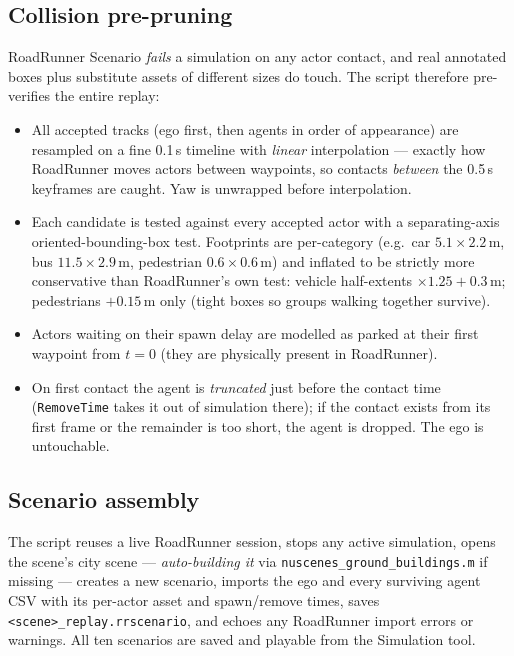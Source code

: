 \documentclass[11pt]{article}
\newcommand{\code}[1]{{\setlength{\fboxsep}{1.5pt}\colorbox{codegray}{\small\texttt{#1}}}}
\newcommand{\file}[1]{\texttt{#1}}
\begin{document}
\subsection{Collision pre-pruning}
RoadRunner Scenario \emph{fails} a simulation on any actor contact, and real annotated
boxes plus substitute assets of different sizes do touch. The script therefore
pre-verifies the entire replay:
\begin{itemize}
\item All accepted tracks (ego first, then agents in order of appearance) are resampled
      on a fine 0.1\,s timeline with \emph{linear} interpolation --- exactly how
      RoadRunner moves actors between waypoints, so contacts \emph{between} the 0.5\,s
      keyframes are caught. Yaw is unwrapped before interpolation.
\item Each candidate is tested against every accepted actor with a separating-axis
      oriented-bounding-box test. Footprints are per-category (e.g.\ car
      $5.1\times2.2$\,m, bus $11.5\times2.9$\,m, pedestrian $0.6\times0.6$\,m) and
      inflated to be strictly more conservative than RoadRunner's own test: vehicle
      half-extents $\times1.25 + 0.3$\,m; pedestrians $+0.15$\,m only (tight boxes so
      groups walking together survive).
\item Actors waiting on their spawn delay are modelled as parked at their first
      waypoint from $t=0$ (they are physically present in RoadRunner).
\item On first contact the agent is \emph{truncated} just before the contact time
      (\code{RemoveTime} takes it out of simulation there); if the contact exists from
      its first frame or the remainder is too short, the agent is dropped. The ego is
      untouchable.
\end{itemize}

\subsection{Scenario assembly}
The script reuses a live RoadRunner session, stops any active simulation, opens the
scene's city scene --- \emph{auto-building it} via
\file{nuscenes\_ground\_buildings.m} if missing --- creates a new scenario, imports the
ego and every surviving agent CSV with its per-actor asset and spawn/remove times,
saves \file{<scene>\_replay.rrscenario}, and echoes any RoadRunner import errors or
warnings. All ten scenarios are saved and playable from the Simulation tool.
\end{document}
